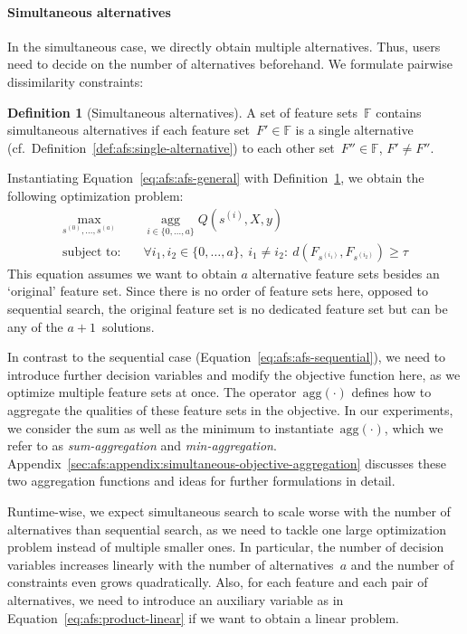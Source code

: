 \documentclass{article}
\theoremstyle{definition}
\newtheorem{definition}[proposition]{Definition} %
\begin{document}
\paragraph{Simultaneous alternatives}

In the simultaneous case, we directly obtain multiple alternatives.
Thus, users need to decide on the number of alternatives beforehand.
We formulate pairwise dissimilarity constraints:
%
\begin{definition}[Simultaneous alternatives]
	A set of feature sets~$\mathbb{F}$ contains simultaneous alternatives if each feature set~$F' \in \mathbb{F}$ is a single alternative (cf.~Definition~\ref{def:afs:single-alternative}) to each other set~$F'' \in \mathbb{F}$, $F' \neq F''$.
	\label{def:afs:simultaneous-alternative}
\end{definition}
%
Instantiating Equation~\ref{eq:afs:afs-general} with Definition~\ref{def:afs:simultaneous-alternative}, we obtain the following optimization problem:
%
\begin{equation}
	\begin{aligned}
		\max_{s^{(0)}, \dots, s^{(a)}} &\quad \operatorname*{agg}_{i \in \{0, \dots, a\}} Q(s^{(i)},X,y) \\
		\text{subject to:} &\quad \forall i_1, i_2 \in \{0, \dots, a\},~i_1 \neq i_2:~d(F_{s^{(i_1)}},F_{s^{(i_2)}}) \geq \tau
	\end{aligned}
	\label{eq:afs:afs-simultaneous}
\end{equation}
%
This equation assumes we want to obtain $a$ alternative feature sets besides an `original' feature set.
Since there is no order of feature sets here, opposed to sequential search, the original feature set is no dedicated feature set but can be any of the $a+1$~solutions.

In contrast to the sequential case (Equation~\ref{eq:afs:afs-sequential}), we need to introduce further decision variables and modify the objective function here, as we optimize multiple feature sets at once.
The operator~$\text{agg}(\cdot)$ defines how to aggregate the qualities of these feature sets in the objective.
In our experiments, we consider the sum as well as the minimum to instantiate~$\text{agg}(\cdot)$, which we refer to as \emph{sum-aggregation} and \emph{min-aggregation}.
Appendix~\ref{sec:afs:appendix:simultaneous-objective-aggregation} discusses these two aggregation functions and ideas for further formulations in detail.

Runtime-wise, we expect simultaneous search to scale worse with the number of alternatives than sequential search, as we need to tackle one large optimization problem instead of multiple smaller ones.
In particular, the number of decision variables increases linearly with the number of alternatives~$a$ and the number of constraints even grows quadratically.
Also, for each feature and each pair of alternatives, we need to introduce an auxiliary variable as in Equation~\ref{eq:afs:product-linear} if we want to obtain a linear problem.
\end{document}
